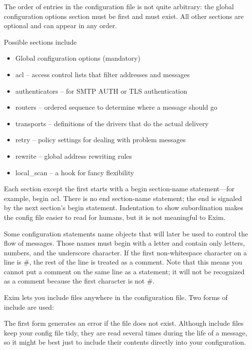The order of entries in the configuration file is not quite arbitrary:
the global configuration options section must be first and must exist.
All other sections are optional and can appear in any order.

Possible sections include

\begin{itemize}
\item
  Global configuration options (mandatory)
\item
  {acl} -- access control lists that filter addresses and messages
\item
  {authenticators} -- for SMTP AUTH or TLS authentication
\item
  {routers} -- ordered sequence to determine where a message should go
\item
  {transports} -- definitions of the drivers that do the actual delivery
\item
  {retry} -- policy settings for dealing with problem messages
\item
  {rewrite} -- global address rewriting rules
\item
  {local\_scan} -- a hook for fancy flexibility
\end{itemize}

Each section except the first starts with a {begin}{ section-name}
statement---for example, {begin acl}. There is no {end}{ section-name}
statement; the end is signaled by the next section's {begin} statement.
Indentation to show subordination makes the config file easier to read
for humans, but it is not meaningful to Exim.

Some configuration statements name objects that will later be used to
control the flow of messages. Those names must begin with a letter and
contain only letters, numbers, and the underscore character. If the
first non-whitespace character on a line is {\#}, the rest of the line
is treated as a comment. Note that this means you cannot put a comment
on the same line as a statement; it will not be recognized as a comment
because the first character is not {\#}.

Exim lets you include files anywhere in the configuration file. Two
forms of include are used:


The first form generates an error if the file does not exist. Although
include files keep your config file tidy, they are read several times
during the life of a message, so it might be best just to include their
contents directly into your configuration.

